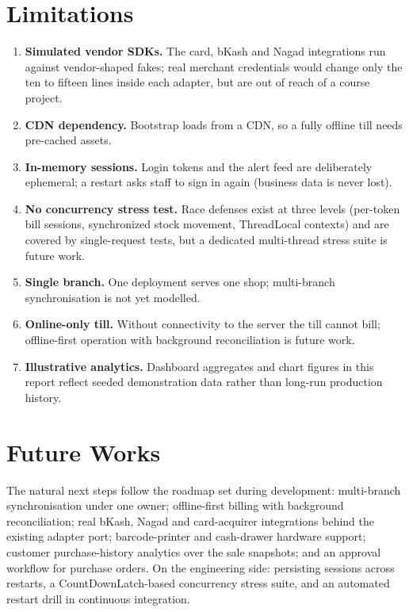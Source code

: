 \documentclass[12pt,a4paper]{report}
\begin{document}
\section{Limitations}
\begin{enumerate}
  \item \textbf{Simulated vendor SDKs.} The card, bKash and Nagad integrations run
        against vendor-shaped fakes; real merchant credentials would change only the ten
        to fifteen lines inside each adapter, but are out of reach of a course project.
  \item \textbf{CDN dependency.} Bootstrap loads from a CDN, so a fully offline till
        needs pre-cached assets.
  \item \textbf{In-memory sessions.} Login tokens and the alert feed are deliberately
        ephemeral; a restart asks staff to sign in again (business data is never lost).
  \item \textbf{No concurrency stress test.} Race defenses exist at three levels
        (per-token bill sessions, synchronized stock movement, ThreadLocal contexts) and
        are covered by single-request tests, but a dedicated multi-thread stress suite is
        future work.
  \item \textbf{Single branch.} One deployment serves one shop; multi-branch
        synchronisation is not yet modelled.
  \item \textbf{Online-only till.} Without connectivity to the server the till cannot
        bill; offline-first operation with background reconciliation is future work.
  \item \textbf{Illustrative analytics.} Dashboard aggregates and chart figures in this
        report reflect seeded demonstration data rather than long-run production
        history.
\end{enumerate}

\section{Future Works}
The natural next steps follow the roadmap set during development: multi-branch
synchronisation under one owner; offline-first billing with background reconciliation;
real bKash, Nagad and card-acquirer integrations behind the existing adapter port;
barcode-printer and cash-drawer hardware support; customer purchase-history analytics
over the sale snapshots; and an approval workflow for purchase orders. On the engineering
side: persisting sessions across restarts, a CountDownLatch-based concurrency stress
suite, and an automated restart drill in continuous integration.
\end{document}
